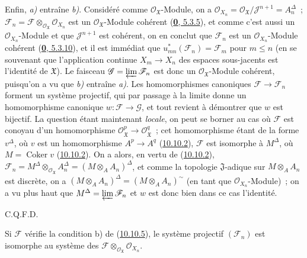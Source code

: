 Enfin, \emph{a)} entraîne \emph{b)}. Considéré comme
$\mathscr{O}_{\mathfrak{X}}$-Module, on a
$\mathscr{O}_{X_n}=\mathscr{O}_{\mathfrak{X}}/
\mathscr{J}^{n+1}=A_n^\Delta$~; $\mathscr{F}_n=\mathscr{F}
\otimes_{\mathscr{O}_{\mathfrak{X}}}\mathscr{O}_{X_n}$ est un
$\mathscr{O}_{\mathfrak{X}}$-Module cohérent
(\hyperref[0.5.3.5-fr]{\textbf{0}, 5.3.5}), et comme c'est aussi un
$\mathscr{O}_{X_n}$-Module et que $\mathscr{J}^{n+1}$ est cohérent,
on en conclut que $\mathscr{F}_n$ est un
$\mathscr{O}_{X_n}$-Module cohérent
(\hyperref[0.5.3.10-fr]{\textbf{0}, 5.3.10}), et il est immédiat que
$u_{mn}^*(\mathscr{F}_n)=\mathscr{F}_m$ pour $m\leq n$ (en se
souvenant que l'application continue $X_m\to X_n$ des espaces
sous-jacents est l'identité de $\mathfrak{X}$). Le faisceau
$\mathscr{G}=\varprojlim\mathscr{F}_n$ est donc un
$\mathscr{O}_{\mathfrak{X}}$-Module cohérent, puisqu'on a vu que \emph{b)}
entraîne \emph{a)}. Les homomorphismes canoniques
$\mathscr{F}\to\mathscr{F}_n$ forment un système projectif, qui par
passage à la limite donne un homomorphisme canonique
$w:\mathscr{F}\to\mathscr{G}$, et tout revient à démontrer que $w$ est
bijectif. La question étant maintenant \emph{locale}, on peut se borner au cas
où $\mathscr{F}$ est conoyau d'un homomorphisme
$\mathscr{O}_{\mathfrak{X}}^p\to\mathscr{O}_{\mathfrak{X}}^q$~; cet
homomorphisme étant de la forme $v^\Delta$, où $v$ est un homomorphisme
$A^p\to A^q$ (\hyperref[I.10.10.2-fr]{10.10.2}), $\mathscr{F}$ est
isomorphe à $M^\Delta$, où $M=\operatorname{Coker}v$
(\hyperref[I.10.10.2-fr]{10.10.2}). On a alors, en vertu de
(\hyperref[I.10.10.2-fr]{10.10.2}),
$\mathscr{F}_n=M^\Delta\otimes_{\mathscr{O}_{\mathfrak{X}}}A_n^\Delta
=(M\otimes_A A_n)^\Delta$, et comme la topologie $\mathfrak{J}$-adique
sur $M\otimes_A A_n$ est discrète, on a
$(M\otimes_A A_n)^\Delta=(M\otimes_A A_n)^{\sim}$ (en tant que
$\mathscr{O}_{X_n}$-Module)~; on a vu plus haut que
$M^\Delta=\varprojlim\mathscr{F}_n$ et $w$ est donc bien dans ce cas
l'identité.
\par\hfill C.Q.F.D.\par

\begin{corollary}[10.10.6]
\label{I.10.10.6-fr}
Si $\mathscr{F}$ vérifie la condition \textup{b)} de
\textup{(\hyperref[I.10.10.5-fr]{10.10.5})}, le système projectif
$(\mathscr{F}_n)$ est isomorphe au système des
$\mathscr{F}\otimes_{\mathscr{O}_{\mathfrak{X}}}\mathscr{O}_{X_n}$.
\end{corollary}

